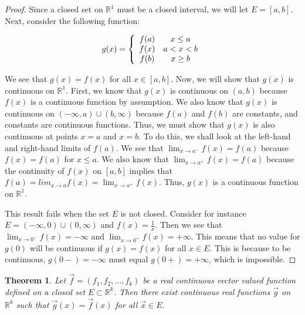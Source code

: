 \documentclass[psamsfonts]{amsart}
\newtheorem{thm}{Theorem}[section]
\theoremstyle{definition}
\theoremstyle{remark}
\numberwithin{equation}{section}
\begin{document}
\begin{proof}
Since a closed set on $\mathbb{R}^1$ must be a closed interval, we will let $E = [a,b]$. Next, consider the following function:

\begin{equation}
g(x) = \left\{ \begin{array}{c c}
f(a) & x \leq a \\
f(x) & a < x < b \\
f(b) & x \geq b 
\end{array} \right.
\end{equation}

We see that $g(x) = f(x)$ for all $x \in [a,b]$. Now, we will show that $g(x)$ is continuous on $\mathbb{R}^1$. First, we know that $g(x)$ is continuous on $(a,b)$ because $f(x)$ is a continuous function by assumption. We also know that $g(x)$ is continuous on $(-\infty,a) \cup (b, \infty)$ because $f(a)$ and $f(b)$ are constants, and constants are continuous functions. Thus, we must show that $g(x)$ is also continuous at points $x = a$ and $x = b$. To do this, we shall look at the left-hand and right-hand limits of $f(a)$. We see that $\lim_{x \to a^{-}} f(x) = f(a)$ because $f(x) = f(a)$ for $x \leq a$. We also know that $\lim_{x \to a^{+}} f(x) = f(a)$ because the continuity of $f(x)$ on $[a,b]$ implies that $f(a) = lim_{x \to a} f(x) = \lim_{x \to a^{+}} f(x)$. Thus, $g(x)$ is a continuous function on $\mathbb{R}^1$.

This result fails when the set $E$ is not closed. Consider for instance $E = (-\infty,0) \cup (0, \infty)$ and $f(x) = \frac{1}{x}$. Then we see that $\lim_{x \to 0^{-}} f(x) = -\infty$ and $\lim_{x \to 0^{+}} f(x) = + \infty$. This means that no value for $g(0)$ will be continuous if $g(x) = f(x)$ for all $x \in E$. This is because to be continuous, $g(0-) = - \infty$ must equal $g(0+) = + \infty$, which is impossible.
\end{proof}

\begin{thm}
Let $\vec{f} = (f_1, f_2, \ldots, f_k)$ be a real continuous vector valued function defined on a closed set $E \subset \mathbb{R}^k$. Then there exist continuous real functions $\vec{g}$ on $\mathbb{R}^k$ such that $\vec{g}(x) = \vec{f}(x)$ for all $\vec{x} \in E$. 
\end{thm}
\end{document}
